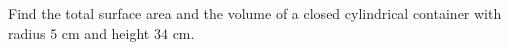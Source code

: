 Find the total surface area and the volume of a closed cylindrical container with radius $5$ cm and height $34$ cm.
